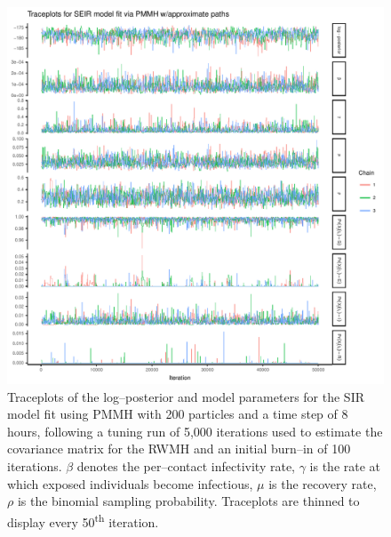 \begin{figure}[htbp]
	\centering
	\includegraphics[width=0.9\linewidth]{figures/seir_pomp_approx_traceplots}
	\caption{Traceplots of the log--posterior and model parameters for the SIR model fit using PMMH with 200 particles and a time step of 8 hours, following a tuning run of 5,000 iterations used to estimate the covariance matrix for the RWMH and an initial burn--in of 100 iterations. $ \beta $ denotes the per--contact infectivity rate, $ \gamma $ is the rate at which exposed individuals become infectious, $ \mu $ is the recovery rate, $ \rho $ is the binomial sampling probability. Traceplots are thinned to display every 50\textsuperscript{th} iteration.}
	\label{fig:seirpompapproxtraceplots}
\end{figure}

